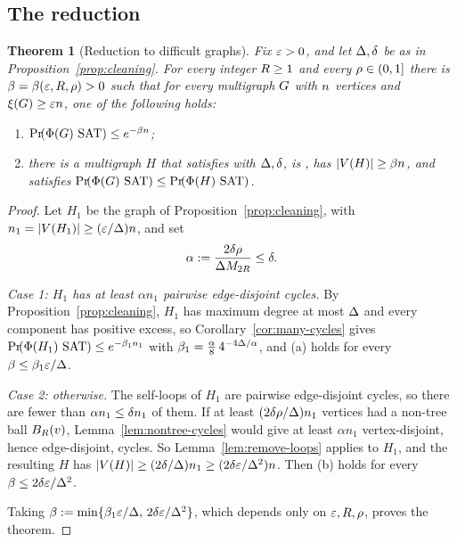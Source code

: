 \documentclass[11pt,a4paper]{article}
\newtheorem{theorem}{Theorem}[section]
\theoremstyle{definition}
\theoremstyle{remark}
\theoremstyle{plain}
\theoremstyle{definition}
\begin{document}
\subsection{The reduction}

\begin{theorem}[Reduction to difficult graphs]\label{thm:reduction}
Fix \(\varepsilon>0\), and let \(\Delta,\delta\) be as in
Proposition~\ref{prop:cleaning}. For every integer \(R\ge1\) and every
\(\rho\in(0,1]\) there is \(\beta=\beta(\varepsilon,R,\rho)>0\) such that for
every multigraph \(G\) with \(n\) vertices and \(\xi(G)\ge\varepsilon n\), one
of the following holds:
\begin{enumerate}[label=(\alph*)]
\item \(\Prx{\rform{\Gin}\SAT}\le e^{-\beta \nvert}\);
\item there is a multigraph \(H\) that satisfies \Hyp{} with
  \(\Delta,\delta\), is \loctree{\rad}{\nontree}, has
  \(|V(H)|\ge\beta n\), and satisfies
  \(\Prx{\rform{\Gin}\SAT}\le\Prx{\rform{H}\SAT}\).
\end{enumerate}
\end{theorem}

\begin{proof}
Let \(H_1\) be the graph of Proposition~\ref{prop:cleaning}, with
\(n_1=|V(H_1)|\ge(\varepsilon/\Delta)n\), and set
\[
  \alpha:=\frac{2\delta\rho}{\Delta M_{2R}}\le\delta .
\]

\emph{Case 1: \(H_1\) has at least \(\alpha n_1\) pairwise edge-disjoint
cycles.} By Proposition~\ref{prop:cleaning}, \(H_1\) has maximum degree at most
\(\Delta\) and every component has positive excess, so
Corollary~\ref{cor:many-cycles} gives
\(\Prx{\rform{H_1}\SAT}\le e^{-\beta_1n_1}\) with
\(\beta_1=\frac\alpha8\,4^{-4\Delta/\alpha}\), and (a) holds for every
\(\beta\le\beta_1\varepsilon/\Delta\).

\emph{Case 2: otherwise.} The self-loops of \(H_1\) are pairwise
edge-disjoint cycles, so there are fewer than \(\alpha n_1\le\delta n_1\) of
them. If at least \((2\delta\rho/\Delta)n_1\) vertices had a non-tree ball
\(B_{R}(v)\), Lemma~\ref{lem:nontree-cycles} would give at least \(\alpha n_1\)
vertex-disjoint, hence edge-disjoint, cycles. So
Lemma~\ref{lem:remove-loops} applies to \(H_1\), and the resulting \(H\) has
\(|V(H)|\ge(2\delta/\Delta)n_1\ge(2\delta\varepsilon/\Delta^2)n\). Then
(b) holds for every \(\beta\le2\delta\varepsilon/\Delta^2\).

Taking \(\beta:=\min\{\beta_1\varepsilon/\Delta,\,2\delta\varepsilon/\Delta^2\}\),
which depends only on \(\varepsilon,R,\rho\), proves the theorem.
\end{proof}
\end{document}
